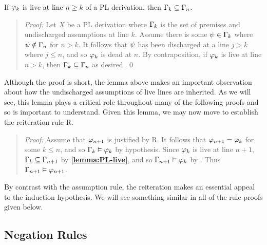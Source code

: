 \begin{Lthm}[Inheritance] \label{lemma:PL-live}
  If $\varphi_k$ is live at line $n \geq k$ of a PL derivation, then $\Gamma_k\subseteq \Gamma_n$.
\end{Lthm}
\vspace{-.2in}

\begin{quote} 
  \textit{Proof:} Let $X$ be a PL derivation where $\Gamma_k$ is the set of premises and undischarged assumptions at line $k$.
  Assume there is some $\psi \in \Gamma_k$ where $\psi \notin \Gamma_n$ for $n > k$.
  It follows that $\psi$ has been discharged at a line $j > k$ where $j \leq n$, and so $\varphi_k$ is dead at $n$.
  By contraposition, if $\varphi_k$ is live at line $n > k$, then $\Gamma_k\subseteq \Gamma_n$ as desired.
  \qed
\end{quote}

Although the proof is short, the lemma above makes an important observation about how the undischarged assumptions of live lines are inherited.
As we will see, this lemma plays a critical role throughout many of the following proofs and so is important to understand.
Given this lemma, we may now move to establish the reiteration rule R.


\begin{quote} 
  \textit{Proof:} Assume that $\varphi_{n+1}$ is justified by R.
  It follows that $\varphi_{n+1}=\varphi_{k}$ for some $k\leq n$, and so $\Gamma_k \vDash \varphi_k$ by hypothesis.
  Since $\varphi_k$ is live at line $n+1$, $\Gamma_k\subseteq \Gamma_{n+1}$ by \textbf{\ref{lemma:PL-live}}, and so $\Gamma_{n+1} \vDash \varphi_{k}$ by .
  Thus $\Gamma_{n+1} \vDash \varphi_{n+1}$.
\end{quote}

By contrast with the assumption rule, the reiteration makes an essential appeal to the induction hypothesis.
We will see something similar in all of the rule proofs given below.



\subsection{Negation Rules}%
  \label{sub:NegationRules}

